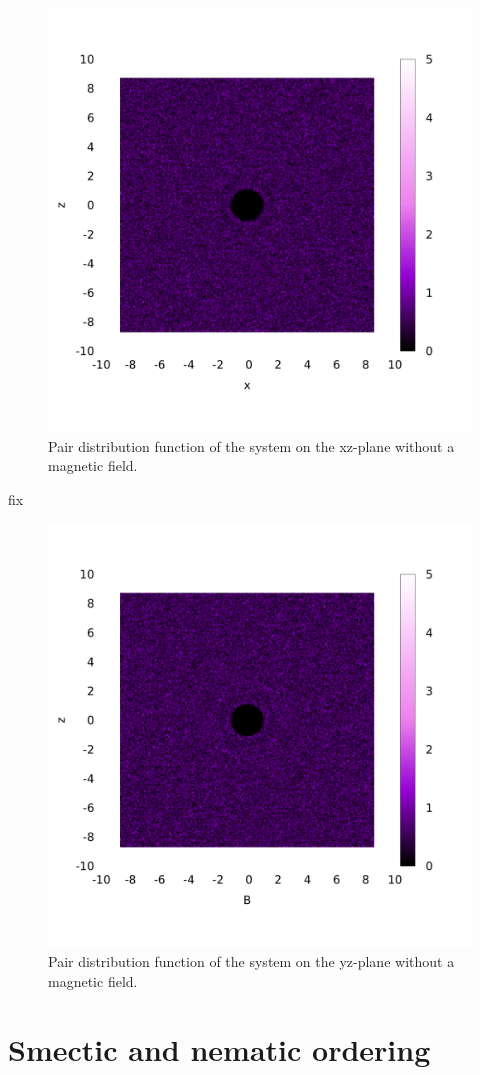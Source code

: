 \documentclass[aip,graphicx]{revtex4-1}
\begin{document}
\begin{figure}
    \centering
    \includegraphics[width=0.7\columnwidth]{gxz_noB.png}
    \caption{Pair distribution function of the system on the xz-plane without a magnetic field.}
    \label{fig:gxz_noB}
\end{figure}

fix
\begin{figure}
    \centering
    \includegraphics[width=0.7\columnwidth]{gyz_noB.png}
    \caption{Pair distribution function of the system on the yz-plane without a magnetic field.}
    \label{fig:gyz_noB}
\end{figure}

\newpage

\section{Smectic and nematic ordering}
\end{document}
